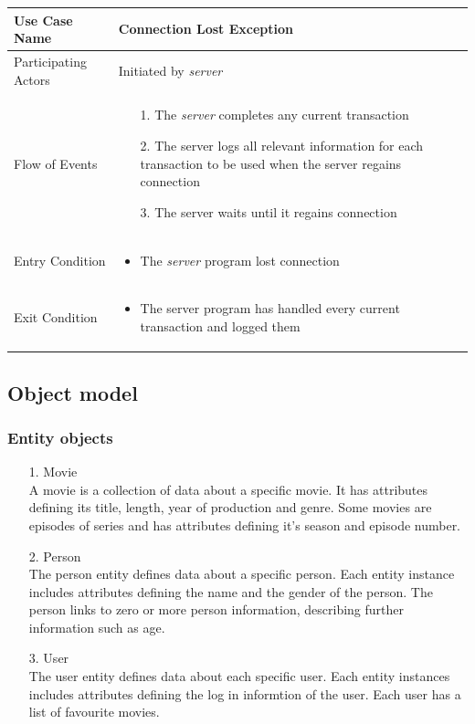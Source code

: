 \begin{center}
	\begin{tabular}{ | l | p{10cm} |  }
		 \hline
		Use Case Name & Connection Lost Exception \\ \hline
		Participating Actors & Initiated by \emph{server} \\ \hline
		Flow of Events & \begin{enumerate}
						\item[1.] The \emph{server} completes any current transaction
						\item[2.] The server logs all relevant information for each transaction to be used when the server regains connection
						\item[3.] The server waits until it regains connection
						\end{enumerate} \\ \hline
		Entry Condition & \begin{itemize}
						\item The \emph{server} program lost connection
					\end{itemize} \\ \hline
		Exit Condition & \begin{itemize}
						\item The server program has handled every current transaction and logged them
					\end{itemize} \\
		\hline
	\end{tabular}
\end{center}

\subsection{Object model}

\subsubsection{Entity objects}

\begin{enumerate}
	\item[1.] Movie \hfill \\
	A movie is a collection of data about a specific movie. It has attributes defining its title, length, year of production and genre. Some movies are episodes of series and has attributes defining it's season and episode number.
	
	\item[2.] Person \hfill \\
	The person entity defines data about a specific person. Each entity instance includes attributes defining the name and the gender of the person. The person links to zero or more person information, describing further information such as age.
	
	\item[3.] User \hfill \\
	The user entity defines data about each specific user. Each entity instances includes attributes defining the log in informtion of the user. Each user has a list of favourite movies.
	
\end{enumerate}

